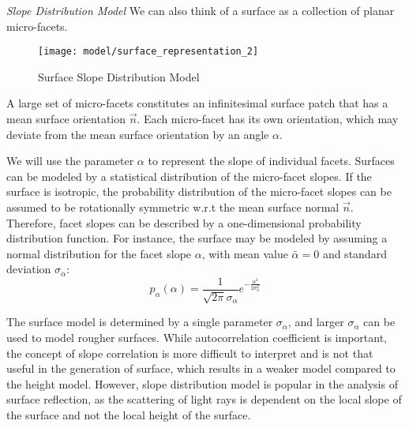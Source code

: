 

\textit{Slope Distribution Model} We can also think of a surface as a collection of planar micro-facets.
\begin{figure}[h]
\centering
\texttt{[image: model/surface\_representation\_2]}
\caption{Surface Slope Distribution Model}
\end{figure}

A large set of micro-facets constitutes an infinitesimal surface patch that has a mean surface orientation $\vec{n}$. Each micro-facet has its own orientation, which may deviate from the mean surface orientation by an angle $\alpha$. 

We will use the parameter $\alpha$ to represent the slope of individual facets. Surfaces can be modeled by a statistical distribution of the micro-facet slopes. If the surface is isotropic, the probability distribution of the micro-facet slopes can be assumed to be rotationally symmetric w.r.t the mean surface normal $\vec{n}$.  Therefore, facet slopes can be described by a one-dimensional probability distribution function. For instance, the surface may be modeled by assuming a normal distribution for the facet slope $\alpha$, with mean value $\bar{\alpha}=0$ and standard deviation $\sigma_\alpha$:
$$
p_\alpha(\alpha)=\frac{1}{\sqrt{2\pi}\sigma_\alpha}e^{-\frac{\alpha^2}{2\sigma_\alpha^2}}
$$

The surface model is determined by a single parameter $\sigma_\alpha$, and larger $\sigma_\alpha$ can be used to model rougher surfaces. While autocorrelation coefficient is important, the concept of slope correlation is more difficult to interpret and is not that useful in the generation of surface, which results in a weaker model compared to the height model. However, slope distribution model is popular in the analysis of surface reflection, as the scattering of light rays is dependent on the local slope of the surface and not the local height of the surface.



